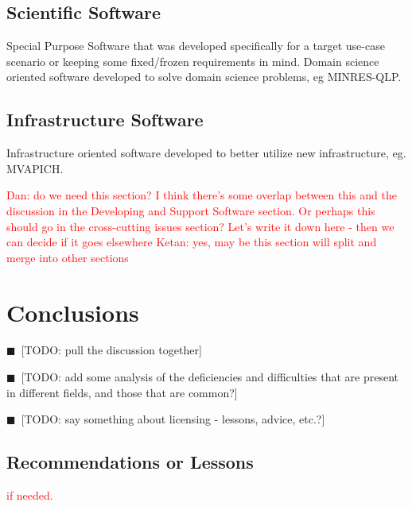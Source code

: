 \documentclass[11pt, oneside]{amsart}
\newcommand{\todo}[1]{{\color{blue}$\blacksquare$~\textsf{[TODO: #1]}}}
\newcommand{\note}[1]{ {\textcolor{red}    { #1 }}}
\begin{document}
\subsection{Scientific Software}
Special Purpose Software that was developed specifically for a target use-case
scenario or keeping some fixed/frozen requirements in mind.  Domain science
oriented software developed to solve domain science problems, eg MINRES-QLP.

\subsection{Infrastructure Software}
Infrastructure oriented software developed to better utilize new
infrastructure, eg. MVAPICH.
%
%

\note{Dan: do we need this section?  I think there's some overlap
  between this and the discussion in the Developing and Support
  Software section.  Or perhaps this should go in the cross-cutting
  issues section?  Let's write it down here - then we can decide if it goes elsewhere}
\note{Ketan: yes, may be this section will split and merge into other sections}

\section{Conclusions} \label{sec:conclusions}

\todo{pull the discussion together}

\todo{add some analysis of the deficiencies and difficulties that are
  present in different fields, and those that are common?}

\todo{say something about licensing - lessons, advice, etc.?}

\subsection{Recommendations or Lessons}

\note{if needed.}
\end{document}
